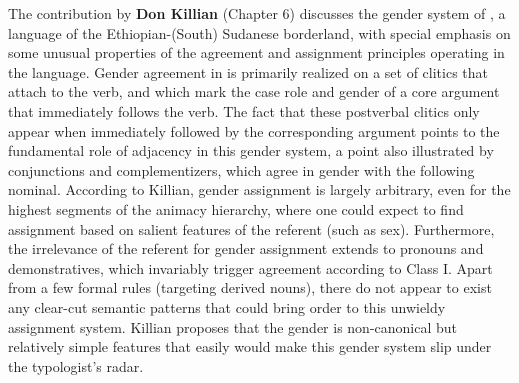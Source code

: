 \documentclass[output=collectionpaper]{langsci/langscibook}
\begin{document}
The contribution by \textbf{Don Killian} (Chapter 6) discusses the gender system of , a  language of the Ethiopian-(South) Sudanese borderland, with special emphasis on some unusual properties of the agreement and assignment principles operating in the language. Gender agreement in  is primarily realized on a set of clitics that attach to the verb, and which mark the case role and gender of a core argument that immediately follows the verb. The fact that these postverbal clitics only appear when immediately followed by the corresponding argument points to the fundamental role of adjacency in this gender system, a point also illustrated by conjunctions and complementizers, which agree in gender with the following nominal. According to Killian, gender assignment is largely arbitrary, even for the highest segments of the animacy hierarchy, where one could expect to find assignment based on salient features of the referent (such as sex). Furthermore, the irrelevance of the referent for gender assignment extends to pronouns and demonstratives, which invariably trigger agreement according to Class I. Apart from a few formal rules (targeting derived nouns), there do not appear to exist any clear-cut semantic patterns that could bring order to this unwieldy assignment system. Killian proposes that the  gender is non-canonical but relatively simple \textendash{} features that easily would make this gender system slip under the typologist’s radar.
\end{document}
